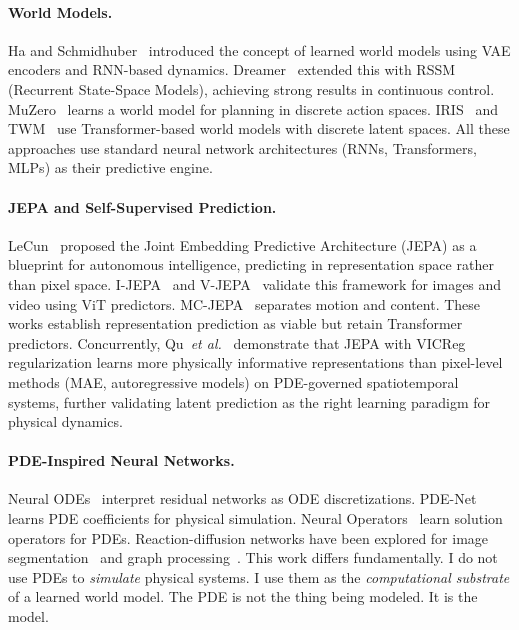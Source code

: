 \documentclass{article}
\newcommand{\etal}{\textit{et al.}}
\begin{document}
\paragraph{World Models.}
Ha and Schmidhuber~\cite{ha2018worldmodels} introduced the concept of learned world models using VAE encoders and RNN-based dynamics. Dreamer~\cite{hafner2020dreamerv1,hafner2021dreamerv2,hafner2023dreamerv3} extended this with RSSM (Recurrent State-Space Models), achieving strong results in continuous control. MuZero~\cite{schrittwieser2020muzero} learns a world model for planning in discrete action spaces. IRIS~\cite{micheli2023iris} and TWM~\cite{robine2023twm} use Transformer-based world models with discrete latent spaces. All these approaches use standard neural network architectures (RNNs, Transformers, MLPs) as their predictive engine.

\paragraph{JEPA and Self-Supervised Prediction.}
LeCun~\cite{lecun2022path} proposed the Joint Embedding Predictive Architecture (JEPA) as a blueprint for autonomous intelligence, predicting in representation space rather than pixel space. I-JEPA~\cite{assran2023ijepa} and V-JEPA~\cite{bardes2024vjepa} validate this framework for images and video using ViT predictors. MC-JEPA~\cite{bardes2023mcjepa} separates motion and content. These works establish representation prediction as viable but retain Transformer predictors. Concurrently, Qu~\etal{}~\cite{qu2026representation} demonstrate that JEPA with VICReg regularization learns more physically informative representations than pixel-level methods (MAE, autoregressive models) on PDE-governed spatiotemporal systems, further validating latent prediction as the right learning paradigm for physical dynamics.

\paragraph{PDE-Inspired Neural Networks.}
Neural ODEs~\cite{chen2018neuralode} interpret residual networks as ODE discretizations. PDE-Net~\cite{long2018pdenet,long2019pdenet2} learns PDE coefficients for physical simulation. Neural Operators~\cite{li2021fno} learn solution operators for PDEs. Reaction-diffusion networks have been explored for image segmentation~\cite{luo2023rdnet} and graph processing~\cite{chamberlain2021grand}. This work differs fundamentally. I do not use PDEs to \emph{simulate} physical systems. I use them as the \emph{computational substrate} of a learned world model. The PDE is not the thing being modeled. It is the model.
\end{document}
